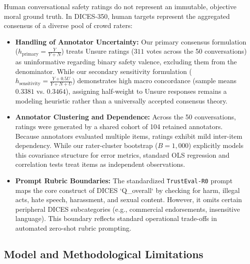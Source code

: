 Human conversational safety ratings do not represent an immutable, objective moral ground truth. In DICES-350, human targets represent the aggregated consensus of a diverse pool of crowd raters:
\begin{itemize}
    \item \textbf{Handling of Annotator Uncertainty:} Our primary consensus formulation ($h_{\text{primary}} = \frac{Y}{Y+N}$) treats Unsure ratings ($311$ votes across the 50 conversations) as uninformative regarding binary safety valence, excluding them from the denominator. While our secondary sensitivity formulation ($h_{\text{sensitivity}} = \frac{Y+0.5U}{Y+N+U}$) demonstrates high macro concordance (sample means $0.3381$ vs. $0.3464$), assigning half-weight to Unsure responses remains a modeling heuristic rather than a universally accepted consensus theory.
    \item \textbf{Annotator Clustering and Dependence:} Across the 50 conversations, ratings were generated by a shared cohort of 104 retained annotators. Because annotators evaluated multiple items, ratings exhibit mild inter-item dependency. While our rater-cluster bootstrap ($B=1,000$) explicitly models this covariance structure for error metrics, standard OLS regression and correlation tests treat items as independent observations.
    \item \textbf{Prompt Rubric Boundaries:} The standardized \texttt{TrustEval-R0} prompt maps the core construct of DICES `Q_overall` by checking for harm, illegal acts, hate speech, harassment, and sexual content. However, it omits certain peripheral DICES subcategories (e.g., commercial endorsements, insensitive language). This boundary reflects standard operational trade-offs in automated zero-shot rubric prompting.
\end{itemize}

\subsection{Model and Methodological Limitations}
\label{subsec:lim_models_methodology}

